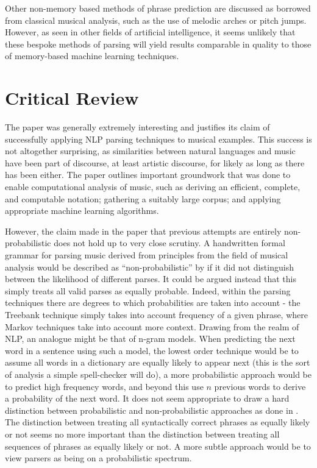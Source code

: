 \documentclass[a4paper,12pt]{article}
\begin{document}
Other non-memory based methods of phrase prediction are discussed as borrowed from classical musical analysis, such as the use of melodic arches or pitch jumps. However, as seen in other fields of artificial intelligence, it seems unlikely that these bespoke methods of parsing will yield results comparable in quality to those of memory-based machine learning techniques.

\section{Critical Review}

The paper was generally extremely interesting and justifies its claim of successfully applying NLP parsing techniques to musical examples. This success is not altogether surprising, as similarities between natural languages and music have been part of discourse, at least artistic discourse, for likely as long as there has been either. The paper outlines important groundwork that was done to enable computational analysis of music, such as deriving an efficient, complete, and computable notation; gathering a suitably large corpus; and applying appropriate machine learning algorithms.

However, the claim made in the paper that previous attempts are entirely non-probabilistic does not hold up to very close scrutiny. A handwritten formal grammar for parsing music derived from principles from the field of musical analysis would be described as ``non-probabilistic'' by \cite{Bod_probabilisticgrammars} if it did not distinguish between the likelihood of different parses. It could be argued instead that this simply treats all valid parses as equally probable. Indeed, within the parsing techniques there are degrees to which probabilities are taken into account - the Treebank technique simply takes into account frequency of a given phrase, where Markov techniques take into account more context. Drawing from the realm of NLP, an analogue might be that of n-gram models. When predicting the next word in a sentence using such a model, the lowest order technique would be to assume all words in a dictionary are equally likely to appear next (this is the sort of analysis a simple spell-checker will do), a more probabilistic approach would be to predict high frequency words, and beyond this use $n$ previous words to derive a probability of the next word. It does not seem appropriate to draw a hard distinction between probabilistic and non-probabilistic approaches as done in \cite{Bod_probabilisticgrammars}. The distinction between treating all syntactically correct phrases as equally likely or not seems no more important than the distinction between treating all sequences of phrases as equally likely or not. A more subtle approach would be to view parsers as being on a probabilistic spectrum.
\end{document}
